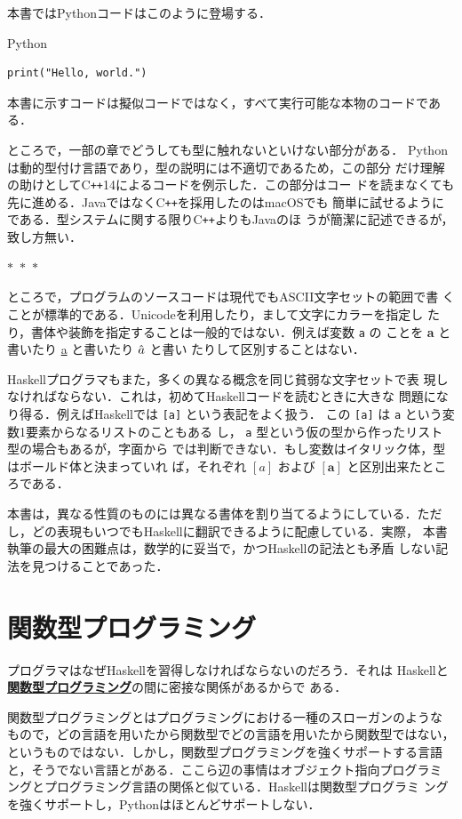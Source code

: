 \documentclass[a5paper,twoside,fleqn,draft]{jsbook}
\newcommand{\separator}{\begin{center}$*$~$*$~$*$\end{center}}
\newcommand{\programminglanguage}[1]{\textsf{#1}}
\newcommand{\cxx}{\programminglanguage{C}\texttt{++}}
\newcommand{\cxxfourteen}{\cxx\programminglanguage{14}}
\newcommand{\haskell}{\programminglanguage{Haskell}}
\newcommand{\java}{\programminglanguage{Java}}
\newcommand{\python}{\programminglanguage{Python}}
\newcommand{\keyword}[1]{{\underline{\textbf{#1}}}}
\newcommand{\code}[1]{\texttt{#1}}
\newenvironment{pythoncode}{\begin{itembox}[r]{\python}}{\end{itembox}}
\newcommand{\mType}[1]{\mathbf{#1}} %
\newcommand{\mA}{\mType{a}}
\begin{document}
本書では\python コードはこのように登場する．
\begin{pythoncode}
\begin{verbatim}
print("Hello, world.")
\end{verbatim}
\end{pythoncode}
本書に示すコードは擬似コードではなく，すべて実行可能な本物のコードであ
る．

ところで，一部の章でどうしても型に触れないといけない部分がある．
\python は動的型付け言語であり，型の説明には不適切であるため，この部分
だけ理解の助けとして\cxxfourteen によるコードを例示した．この部分はコー
ドを読まなくても先に進める．\java ではなく\cxx を採用したのはmacOSでも
簡単に試せるようにである．型システムに関する限り\cxx よりも\java のほ
うが簡潔に記述できるが，致し方無い．

\separator

ところで，プログラムのソースコードは現代でもASCII文字セットの範囲で書
くことが標準的である．Unicodeを利用したり，まして文字にカラーを指定し
たり，書体や装飾を指定することは一般的ではない．例えば変数 \code{a} の
ことを \textbf{a} と書いたり \underline{a} と書いたり $\Hat a$ と書い
たりして区別することはない．

\haskell プログラマもまた，多くの異なる概念を同じ貧弱な文字セットで表
現しなければならない．これは，初めて\haskell コードを読むときに大きな
問題になり得る．例えば\haskell では \code{[a]} という表記をよく扱う．
この \code{[a]} は \code{a} という変数1要素からなるリストのこともある
し， \code{a} 型という仮の型から作ったリスト型の場合もあるが，字面から
では判断できない．もし変数はイタリック体，型はボールド体と決まっていれ
ば，それぞれ $[a]$ および $[\mA]$ と区別出来たところである．

本書は，異なる性質のものには異なる書体を割り当てるようにしている．ただ
し，どの表現もいつでも\haskell に翻訳できるように配慮している．実際，
本書執筆の最大の困難点は，数学的に妥当で，かつ\haskell の記法とも矛盾
しない記法を見つけることであった．

\section{関数型プログラミング}

プログラマはなぜ\haskell を習得しなければならないのだろう．それは
\haskell と\keyword{関数型プログラミング}の間に密接な関係があるからで
ある．

関数型プログラミングとはプログラミングにおける一種のスローガンのような
もので，どの言語を用いたから関数型でどの言語を用いたから関数型ではない，
というものではない．しかし，関数型プログラミングを強くサポートする言語
と，そうでない言語とがある．ここら辺の事情はオブジェクト指向プログラミ
ングとプログラミング言語の関係と似ている．\haskell は関数型プログラミ
ングを強くサポートし，\python はほとんどサポートしない．
\end{document}
